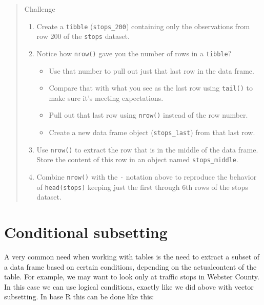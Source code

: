 \documentclass[
]{book}
\providecommand{\tightlist}{%
  \setlength{\itemsep}{0pt}\setlength{\parskip}{0pt}}
\begin{document}
\begin{quote}
Challenge

\begin{enumerate}
\def\labelenumi{\arabic{enumi}.}
\item
  Create a \texttt{tibble} (\texttt{stops\_200}) containing only the observations from
  row 200 of the \texttt{stops} dataset.
\item
  Notice how \texttt{nrow()} gave you the number of rows in a \texttt{tibble}?

  \begin{itemize}
  \tightlist
  \item
    Use that number to pull out just that last row in the data frame.
  \item
    Compare that with what you see as the last row using \texttt{tail()} to make
    sure it's meeting expectations.
  \item
    Pull out that last row using \texttt{nrow()} instead of the row number.
  \item
    Create a new data frame object (\texttt{stops\_last}) from that last row.
  \end{itemize}
\item
  Use \texttt{nrow()} to extract the row that is in the middle of the data
  frame. Store the content of this row in an object named \texttt{stops\_middle}.
\item
  Combine \texttt{nrow()} with the \texttt{-} notation above to reproduce the behavior of
  \texttt{head(stops)} keeping just the first through 6th rows of the stops
  dataset.
\end{enumerate}
\end{quote}

\hypertarget{conditional-subsetting-1}{%
\section{Conditional subsetting}\label{conditional-subsetting-1}}

A very common need when working with tables is the need to extract a subset of a data frame based on certain conditions, depending on the actualcontent of the table. For example, we may want to look only at traffic stops in Webster County. In this case we can use logical conditions, exactly like we did above with vector subsetting. In base R this can be done like this:
\end{document}

